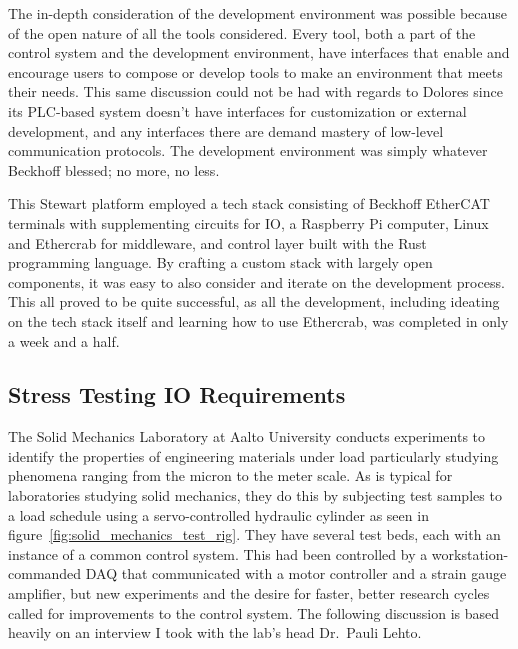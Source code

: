 \documentclass[english,12pt,a4paper,pdftex,eng,utf8]{aaltothesis}
\begin{document}
The in-depth consideration of the development environment was possible because of the open nature of all the tools considered.  Every tool, both a part of the control system and the development environment, have interfaces that enable and encourage users to compose or develop tools to make an environment that meets their needs.  This same discussion could not be had with regards to Dolores since its PLC-based system doesn't have interfaces for customization or external development, and any interfaces there are demand mastery of low-level communication protocols.  The development environment was simply whatever Beckhoff blessed; no more, no less.

This Stewart platform employed a tech stack consisting of Beckhoff EtherCAT terminals with supplementing circuits for IO, a Raspberry Pi computer, Linux and Ethercrab for middleware, and control layer built with the Rust programming language.  By crafting a custom stack with largely open components, it was easy to also consider and iterate on the development process.  This all proved to be quite successful, as all the development, including ideating on the tech stack itself and learning how to use Ethercrab, was completed in only a week and a half.

\subsection{Stress Testing IO Requirements}

The Solid Mechanics Laboratory at Aalto University conducts experiments to identify the properties of engineering materials under load particularly studying phenomena ranging from the micron to the meter scale.  As is typical for laboratories studying solid mechanics, they do this by subjecting test samples to a load schedule using a servo-controlled hydraulic cylinder as seen in figure~\ref{fig:solid_mechanics_test_rig}.  They have several test beds, each with an instance of a common control system.  This had been controlled by a workstation-commanded DAQ that communicated with a motor controller and a strain gauge amplifier, but new experiments and the desire for faster, better research cycles called for improvements to the control system.  The following discussion is based heavily on an interview I took with the lab's head Dr.~Pauli Lehto.
\end{document}
